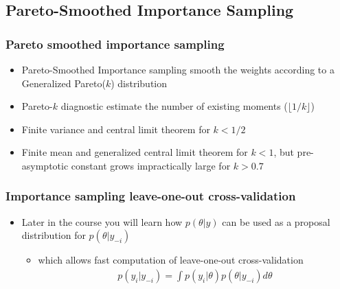 \documentclass[10pt]{beamer}
\begin{document}
\subsection{Pareto-Smoothed Importance Sampling}


\begin{frame}

\frametitle{Pareto smoothed importance sampling}

  \begin{itemize}
  \item Pareto-Smoothed Importance sampling smooth the weights according to a Generalized Pareto($k$) distribution
  \item Pareto-$k$ diagnostic estimate the number of existing moments ($\lfloor 1/k \rfloor$)
  \item<2-> Finite variance and central limit theorem for $k<1/2$
  \item<3-> Finite mean and generalized central limit theorem for $k<1$,
    but pre-asymptotic constant grows impractically large for $k>0.7$
  \end{itemize}
\end{frame}

\begin{frame}

\frametitle{Importance sampling leave-one-out cross-validation}

  \begin{itemize}
  \item Later in the course you will learn how $p(\theta|y)$ can be
    used as a proposal distribution for $p(\theta|y_{-i})$
    \begin{itemize}
    \item which allows fast computation of leave-one-out cross-validation
      \begin{align*}
        p(y_i|y_{-i})=\int p(y_i|\theta) p(\theta|y_{-i}) d\theta
      \end{align*}
    \end{itemize}
  \end{itemize}

\end{frame}

%
%
%
\end{document}
